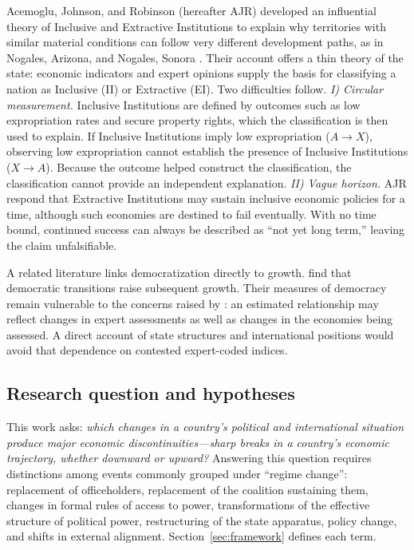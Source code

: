 \documentclass[11pt]{article}
\begin{document}
Acemoglu, Johnson, and Robinson (hereafter AJR) developed an influential theory of Inclusive and Extractive Institutions to explain why territories with similar material conditions can follow very different development paths, as in Nogales, Arizona, and Nogales, Sonora \parencite{acemoglu_johnson_robinson_2001,acemoglu_johnson_robinson_2005,acemoglu_robinson_2012}. Their account offers a thin theory of the state: economic indicators and expert opinions supply the basis for classifying a nation as Inclusive (II) or Extractive (EI). Two difficulties follow. \textit{I) Circular measurement.} Inclusive Institutions are defined by outcomes such as low expropriation rates and secure property rights, which the classification is then used to explain. If Inclusive Institutions imply low expropriation ($A \to X$), observing low expropriation cannot establish the presence of Inclusive Institutions ($X \to A$). Because the outcome helped construct the classification, the classification cannot provide an independent explanation. \textit{II) Vague horizon.} AJR respond that Extractive Institutions may sustain inclusive economic policies for a time, although such economies are destined to fail eventually. With no time bound, continued success can always be described as ``not yet long term,'' leaving the claim unfalsifiable.

A related literature links democratization directly to growth. \textcite{acemoglu_naidu_restrepo_robinson_2019} find that democratic transitions raise subsequent growth. Their measures of democracy remain vulnerable to the concerns raised by \textcite{little_meng_2024}: an estimated relationship may reflect changes in expert assessments as well as changes in the economies being assessed. A direct account of state structures and international positions would avoid that dependence on contested expert-coded indices.

\subsection{Research question and hypotheses}

This work asks: \emph{which changes in a country's political and international situation produce major economic discontinuities---sharp breaks in a country's economic trajectory, whether downward or upward?} Answering this question requires distinctions among events commonly grouped under ``regime change'': replacement of officeholders, replacement of the coalition sustaining them, changes in formal rules of access to power, transformations of the effective structure of political power, restructuring of the state apparatus, policy change, and shifts in external alignment. Section~\ref{sec:framework} defines each term.
\end{document}
